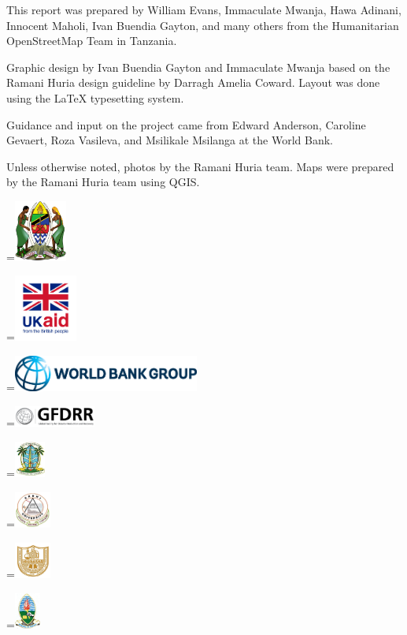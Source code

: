 \documentclass[a4paper,12pt,twoside]{article}
\newcommand*{\vcenteredhbox}[1]{\begingroup
\setbox0=\hbox{#1}\parbox{\wd0}{\box0}\endgroup} %
\begin{document}
This report was prepared by William Evans, Immaculate Mwanja, Hawa Adinani, Innocent Maholi, Ivan Buendia Gayton, and many others from the Humanitarian OpenStreetMap Team in Tanzania.

\medskip

Graphic design by Ivan Buendia Gayton and Immaculate Mwanja based on the Ramani Huria design guideline by Darragh Amelia Coward. Layout was done using the \LaTeX { } typesetting system.

\medskip

Guidance and input on the project came from Edward Anderson, Caroline Gevaert, Roza Vasileva, and Msilikale Msilanga at the World Bank.

\medskip

Unless otherwise noted, photos by the Ramani Huria team. Maps were prepared by the Ramani Huria team using QGIS.

\bigskip\bigskip\bigskip\bigskip\bigskip

\vcenteredhbox{\includegraphics[height=2cm]{images/logo_Coat_of_arms_of_Tanzania.png}}
\vcenteredhbox{\includegraphics[height=2.2cm]{UK-aid_logo.png}}
\vcenteredhbox{\includegraphics[height=1.2cm]{images/World_Bank_Group_logo.png}}
\vcenteredhbox{\includegraphics[height=0.7cm]{images/logo_GFDRR.png}}

\medskip

\vcenteredhbox{\includegraphics[height=1.2cm]{images/logo_dar-es-salaam.jpg}}
\vcenteredhbox{\includegraphics[height=1.2cm]{images/logo_Ardhi.png}}
\vcenteredhbox{\includegraphics[height=1.2cm]{images/logo_costech.png}}
\vcenteredhbox{\includegraphics[height=1.2cm]{images/logo_UDSM.jpg}}
\end{document}
